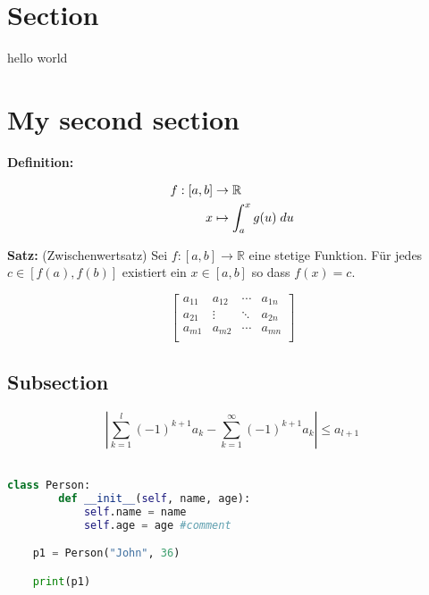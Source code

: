 \documentclass[11pt, a4paper]{article}
\begin{document}
	

\setformat
\maketitle
{\sffamily\tableofcontents}

\pagebreak
	
\section{Section}
\begin{fullbox}
	hello world
\end{fullbox}
\section{My second section}
\textbf{Definition:} \lipsum[13]
	
\begin{fullbox}
 	\begin{align*}
 		f:[a,b] &\rightarrow \mathbb{R}\\
 		x &\mapsto \int_a^x g(u)\; du
 	\end{align*}
\end{fullbox}
	
\begin{outline}
	\textbf{Satz:} (Zwischenwertsatz) Sei $f:[a,b]\rightarrow \mathbb R$ eine stetige Funktion. Für jedes $c \in [f(a),f(b)]$ existiert ein $x \in [a,b]$ so dass $f(x) = c$.  
	 
	\[\begin{bmatrix} 
		a_{11} & a_{12} & \dotsi & a_{1n}\\
		a_{21} & \vdots & \ddots & a_{2n}\\
		a_{m1} & a_{m2} & \dotsi & a_{mn}\\ 
	\end{bmatrix}\]
\end{outline}
	 	
\subsection{Subsection}

\[\left| \sum_{k=1}^l (-1)^{k+1} a_k -\sum_{k=1}^\infty (-1)^{k+1} a_k\right| \leq a_{l+1}\]\
	
	
\begin{lstlisting}[language=Python]
	class Person:
  		def __init__(self, name, age):
    		self.name = name
    		self.age = age #comment

	p1 = Person("John", 36)

	print(p1)\end{lstlisting}

	
\end{document}
